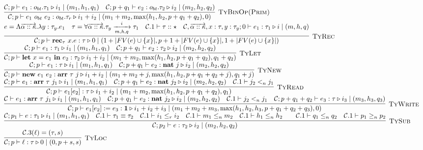 \documentclass[fleqn]{article}
\begin{document}
\[\begin{array}{l}
	\infer[\textsc{TyBinOp(Prim)}]{\jtygc{\mathcal{C};p }{ e_1~o_{bt}~e_2 }{o_{bt}.\tau_r }{ i_1 + i_2 }{ m_1 + m_2}{\max(h_1,h_2,p+q_1+q_2)}{0} }{\jtygc{\mathcal{C};p }{ e_1 }{ o_{bt}.\tau_1 }{ i_1 }{ m_1}{h_1}{q_1} & \jtygc{\mathcal{C};p+q_1 }{ e_2 }{ o_{bt}.\tau_2 }{ i_2 }{ m_2}{h_2}{q_2} } \\
	
	\infer[\textsc{TyRec}]{\jtygc{\mathcal{C};p }{ \mathbf{rec}_\tau~x. e }{ \tau }{ 0 }{1 + |FV(e) \cup \{x\}| }{ p+1+|FV(e)\cup\{x\}| }{1+|FV(e)\cup\{x\}|} }{e = \Lambda \overrightarrow{\alpha :: \kappa}. \lambda y : \tau_y. e_1 & \tau = \forall \overrightarrow{\alpha :: \kappa}. \tau_y \xrightarrow[m,h,q]{i} \tau_1 & \mathcal{C}.1 \vdash \tau :: \star & \jtygc{ \mathcal{C},\overrightarrow{\alpha::\kappa},x:\tau,y:\tau_y;0 }{ e_1 }{ \tau_1 }{ i }{ m}{h}{q}  } \\
	
	\infer[\textsc{TyLet}]{\jtygc{\mathcal{C};p }{ \mathbf{let}~x=e_1~\mathbf{in}~e_2 }{ \tau_2 }{ i_1 + i_2 }{ m_1 + m_2}{\max(h_1,h_2,p+q_1+q_2)}{q_1+q_2} }{\jtygc{\mathcal{C};p }{ e_1 }{ \tau_1 }{ i_1 }{ m_1 }{h_1}{q_1} & \jtygc{\mathcal{C};p+q_1 }{ e_2 }{ \tau_2 }{ i_2 }{ m_2}{h_2}{q_2} } \\
	
	\infer[\textsc{TyNew}]{\jtygc{\mathcal{C};p }{ \mathbf{new}~e_1~e_2 }{ \mathbf{arr}~\tau~j }{ i_1 + i_2 }{ m_1 + m_2 + j}{\max(h_1,h_2,p+q_1+q_2+j) }{q_1+j} }{\jtygc{\mathcal{C};p }{ e_1 }{\tau }{ i_1 }{ m_1}{h_1}{q_1}  & \jtygc{\mathcal{C};p+q_1 }{ e_2 }{ \mathbf{nat}~j }{ i_2 }{ m_2}{h_2}{q_2} } \\
	
	\infer[\textsc{TyRead}]{\jtygc{\mathcal{C};p }{ e_1[e_2] }{ \tau }{ i_1 + i_2 }{ m_1 + m_2}{\max(h_1,h_2,p+q_1+q_2)}{q_1} }{\jtygc{\mathcal{C};p }{ e_1 }{ \mathbf{arr}~\tau~j_1 }{ i_1 }{ m_1}{h_1}{q_1} & \jtygc{\mathcal{C};p+q_1 }{ e_2 }{ \mathbf{nat}~j_2 }{ i_2 }{ m_2}{h_2}{q_2} & \mathcal{C}.1 \vdash j_2 <_n j_1 } \\
	
	\infer[\textsc{TyWrite}]{\jtygc{\mathcal{C};p }{ e_1[e_2] := e_3 }{ \mathbf{1} }{ i_1 + i_2 + i_3 }{ m_1 + m_2 + m_3}{\max(h_1,h_2,h_3,p+q_1+q_2+q_3)}{0} }{\jtygc{\mathcal{C} }{ e_1 }{ \mathbf{arr}~\tau~j_1 }{ i_1 }{ m_1}{h_1}{q_1} & \jtygc{\mathcal{C};p+q_1 }{ e_2 }{\mathbf{nat}~j_2 }{ i_2 }{ m_2}{h_2}{q_2} & \mathcal{C}.1 \vdash j_2 <_n j_1 & \jtygc{\mathcal{C};p+q_1+q_2 }{ e_3 }{ \tau }{ i_3 }{ m_3}{h_3}{q_3} } \\
	
	\infer[\textsc{TySub}]{\jtygc{\mathcal{C};p_2 }{ e }{\tau_2 }{ i_2 }{ m_2}{h_2}{q_2} }{\jtygc{\mathcal{C};p_1 }{ e }{ \tau_1 }{ i_1 }{ m_1 }{h_1}{q_1} & \mathcal{C}.1 \vdash \tau_1 \equiv \tau_2 & \mathcal{C}.1 \vdash i_1 \le_r i_2 & \mathcal{C}.1 \vdash m_1 \le_n m_2 & \mathcal{C}.1 \vdash h_1 \le_n h_2 && \mathcal{C}.1 \vdash q_1 \le_n q_2 & \mathcal{C}.1 \vdash p_1 \ge_n p_2} \\
	
	\infer[\textsc{TyLoc}]{\jtygc{\mathcal{C};p}{\ell}{\tau}{0}{0}{p+s}{s} }{ \mathcal{C}.3(\ell) = (\tau,s)  }
	
\end{array}
\]
\end{document}
